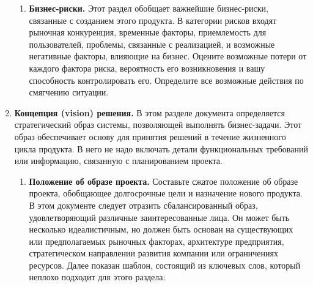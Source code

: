 \documentclass{../../text-style}
\begin{document}
\begin{enumerate}
\begin{enumerate}
        \item \textbf{Бизнес-риски.}
        Этот раздел обобщает важнейшие бизнес-риски, связанные с созданием этого продукта.
        В категории рисков входят рыночная конкуренция, временные факторы, приемлемость для пользователей, проблемы, связанные с реализацией, и возможные негативные факторы, влияющие на бизнес.
        Оцените возможные потери от каждого фактора риска, вероятность его возникновения и вашу способность контролировать его.
        Определите все возможные действия по смягчению ситуации.
    \end{enumerate}
    \item \textbf{Концепция (vision) решения.}
    В этом разделе документа определяется стратегический образ системы, позволяющей выполнять бизнес-задачи.
    Этот образ обеспечивает основу для принятия решений в течение жизненного цикла продукта.
    В него не надо включать детали функциональных требований или информацию, связанную с планированием проекта.
    \begin{enumerate}
        \item \textbf{Положение об образе проекта.}
        Составьте сжатое положение об образе проекта, обобщающее долгосрочные цели и назначение нового продукта.
        В этом документе следует отразить сбалансированный образ, удовлетворяющий различные заинтересованные лица.
        Он может быть несколько идеалистичным, но должен быть основан на существующих или предполагаемых рыночных факторах, архитектуре предприятия, стратегическом направлении развития компании или ограничениях ресурсов.
        Далее показан шаблон, состоящий из ключевых слов, который неплохо подходит для этого раздела:


\end{enumerate}
\end{enumerate}
\end{document}
